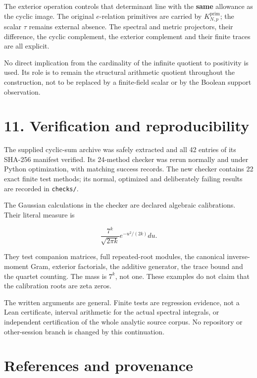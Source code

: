 \documentclass[
  11pt,
]{article}
\begin{document}
The exterior operation controls that determinant line with the
\textbf{same} allowance as the cyclic image. The original \(e\)-relation
primitives are carried by \(K_{N,p}^{\mathrm{prim}}\); the scalar
\(\tau\) remains external absence. The spectral and metric projectors,
their difference, the cyclic complement, the exterior complement and
their finite traces are all explicit.

No direct implication from the cardinality of the infinite quotient to
positivity is used. Its role is to remain the structural arithmetic
quotient throughout the construction, not to be replaced by a
finite-field scalar or by the Boolean support observation.

\section{11. Verification and
reproducibility}\label{verification-and-reproducibility}

The supplied cyclic-sum archive was safely extracted and all 42 entries
of its SHA-256 manifest verified. Its 24-method checker was rerun
normally and under Python optimization, with matching success records.
The new checker contains 22 exact finite test methods; its normal,
optimized and deliberately failing results are recorded in
\texttt{checks/}.

The Gaussian calculations in the checker are declared algebraic
calibrations. Their literal measure is

\[
\frac{7^k}{\sqrt{2\pi k}}e^{-u^2/(2k)}du.
\]

They test companion matrices, full repeated-root modules, the canonical
inverse-moment Gram, exterior factorials, the additive generator, the
trace bound and the quartet counting. The mass is \(7^k\), not one.
These examples do not claim that the calibration roots are zeta zeros.

The written arguments are general. Finite tests are regression evidence,
not a Lean certificate, interval arithmetic for the actual spectral
integrals, or independent certification of the whole analytic source
corpus. No repository or other-session branch is changed by this
continuation.

\section{References and provenance}\label{references-and-provenance}
\end{document}
